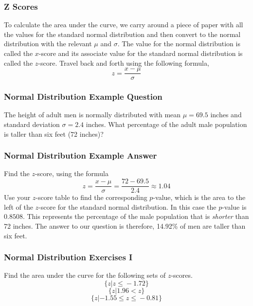 \documentclass[xcolor=dvipsnames]{beamer}
\begin{document}
\begin{frame}
  \frametitle{Z Scores}
  To calculate the area under the curve, we carry around a piece of
  paper with all the values for the \alert{standard normal
    distribution} and then convert to the normal distribution with the
  relevant $\mu$ and $\sigma$. The value for the normal distribution
  is called the \alert{$x$-score} and its associate value for the
  standard normal distribution is called the \alert{$z$-score}. Travel
  back and forth using the following formula,
  \begin{equation}
    \label{eq:uotoogoo}
    z=\frac{x-\mu}{\sigma}
  \end{equation}
\end{frame}

\begin{frame}
  \frametitle{Normal Distribution Example Question}
   The height of adult men is normally
  distributed with mean $\mu=69.5$ inches and standard deviation
  $\sigma=2.4$ inches. What percentage of the adult male population is
  taller than six feet (72 inches)? 
\end{frame}

\begin{frame}
  \frametitle{Normal Distribution Example Answer}
  Find the $z$-score, using the formula
  \begin{equation}
    \label{eq:igutheib}
    z=\frac{x-\mu}{\sigma}=\frac{72-69.5}{2.4}\approx{}1.04
  \end{equation}
  Use your $z$-score table to find the corresponding
  \alert{$p$-value}, which is the area to the left of the $z$-score
  for the standard normal distribution. In this case the $p$-value is
  $0.8508$. This represents the percentage of the male population that
  is \emph{shorter} than 72 inches. The answer to our question is
  therefore, 14.92\% of men are taller than six feet.
\end{frame}

\begin{frame}
  \frametitle{Normal Distribution Exercises I}
{\ubung} Find the area under the curve for the following sets of
$z$-scores. 
\begin{equation}
  \label{eq:deapheph}
\{z|z\leq{}-1.72\}  
\end{equation}
\begin{equation}
  \label{eq:taedaiga}
\{z|1.96<{}z\}  
\end{equation}
\begin{equation}
  \label{eq:ahraefis}
\{z|-1.55\leq{}z\leq{}-0.81\}
\end{equation}
\end{frame}
\end{document}
